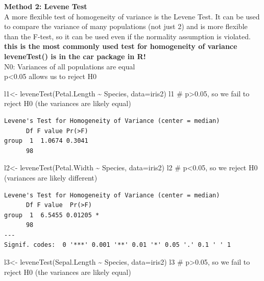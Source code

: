 \documentclass[
  letterpaper,
  DIV=11,
  numbers=noendperiod]{scrartcl}
\newenvironment{Shaded}{\begin{snugshade}}{\end{snugshade}}
\newcommand{\AttributeTok}[1]{\textcolor[rgb]{0.40,0.45,0.13}{#1}}
\newcommand{\CommentTok}[1]{\textcolor[rgb]{0.37,0.37,0.37}{#1}}
\newcommand{\FunctionTok}[1]{\textcolor[rgb]{0.28,0.35,0.67}{#1}}
\newcommand{\NormalTok}[1]{\textcolor[rgb]{0.00,0.23,0.31}{#1}}
\newcommand{\OtherTok}[1]{\textcolor[rgb]{0.00,0.23,0.31}{#1}}
\newcommand{\SpecialCharTok}[1]{\textcolor[rgb]{0.37,0.37,0.37}{#1}}
\begin{document}
\hfill\break
\textbf{Method 2: Levene Test}\\
A more flexible test of homogeneity of variance is the Levene Test. It
can be used to compare the variance of many populations (not just 2) and
is more flexible than the F-test, so it can be used even if the
normality assumption is violated.\\
\textbf{this is the most commonly used test for homogeneity of
variance}\\
\textbf{leveneTest() is in the car package in R!}\\

N0: Variances of all populations are equal\\
p\textless0.05 allows us to reject H0

\begin{Shaded}
\begin{Highlighting}[]
\NormalTok{l1}\OtherTok{\textless{}{-}} \FunctionTok{leveneTest}\NormalTok{(Petal.Length }\SpecialCharTok{\textasciitilde{}}\NormalTok{ Species, }\AttributeTok{data=}\NormalTok{iris2)}
\NormalTok{l1 }\CommentTok{\# p\textgreater{}0.05, so we fail to reject H0 (the variances are likely equal)}
\end{Highlighting}
\end{Shaded}

\begin{verbatim}
Levene's Test for Homogeneity of Variance (center = median)
      Df F value Pr(>F)
group  1  1.0674 0.3041
      98               
\end{verbatim}

\begin{Shaded}
\begin{Highlighting}[]
\NormalTok{l2}\OtherTok{\textless{}{-}} \FunctionTok{leveneTest}\NormalTok{(Petal.Width }\SpecialCharTok{\textasciitilde{}}\NormalTok{ Species, }\AttributeTok{data=}\NormalTok{iris2)}
\NormalTok{l2 }\CommentTok{\# p\textless{}0.05, so we reject H0 (variances are likely different)}
\end{Highlighting}
\end{Shaded}

\begin{verbatim}
Levene's Test for Homogeneity of Variance (center = median)
      Df F value  Pr(>F)  
group  1  6.5455 0.01205 *
      98                  
---
Signif. codes:  0 '***' 0.001 '**' 0.01 '*' 0.05 '.' 0.1 ' ' 1
\end{verbatim}

\begin{Shaded}
\begin{Highlighting}[]
\NormalTok{l3}\OtherTok{\textless{}{-}} \FunctionTok{leveneTest}\NormalTok{(Sepal.Length }\SpecialCharTok{\textasciitilde{}}\NormalTok{ Species, }\AttributeTok{data=}\NormalTok{iris2)}
\NormalTok{l3 }\CommentTok{\# p\textgreater{}0.05, so we fail to reject H0 (the variances are likely equal)}
\end{Highlighting}
\end{Shaded}
\end{document}
